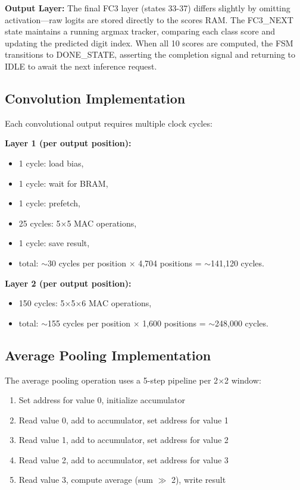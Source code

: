 \documentclass[12pt,a4paper]{report}
\begin{document}
\textbf{Output Layer:} The final FC3 layer (states 33-37) differs slightly by omitting activation—raw logits are stored directly to the scores RAM. The FC3\_NEXT state maintains a running argmax tracker, comparing each class score and updating the predicted digit index. When all 10 scores are computed, the FSM transitions to DONE\_STATE, asserting the completion signal and returning to IDLE to await the next inference request.

\subsection{Convolution Implementation}

Each convolutional output requires multiple clock cycles:

\textbf{Layer 1 (per output position):}
\begin{itemize}
    \item 1 cycle: load bias,
    \item 1 cycle: wait for BRAM,
    \item 1 cycle: prefetch,
    \item 25 cycles: 5$\times$5 MAC operations,
    \item 1 cycle: save result,
    \item total: $\sim$30 cycles per position $\times$ 4,704 positions = $\sim$141,120 cycles.
\end{itemize}

\textbf{Layer 2 (per output position):}
\begin{itemize}
    \item 150 cycles: 5$\times$5$\times$6 MAC operations,
    \item total: $\sim$155 cycles per position $\times$ 1,600 positions = $\sim$248,000 cycles.
\end{itemize}

\subsection{Average Pooling Implementation}

The average pooling operation uses a 5-step pipeline per 2$\times$2 window:

\begin{enumerate}
    \item Set address for value 0, initialize accumulator
    \item Read value 0, add to accumulator, set address for value 1
    \item Read value 1, add to accumulator, set address for value 2
    \item Read value 2, add to accumulator, set address for value 3
    \item Read value 3, compute average (sum $\gg$ 2), write result
\end{enumerate}
\end{document}
